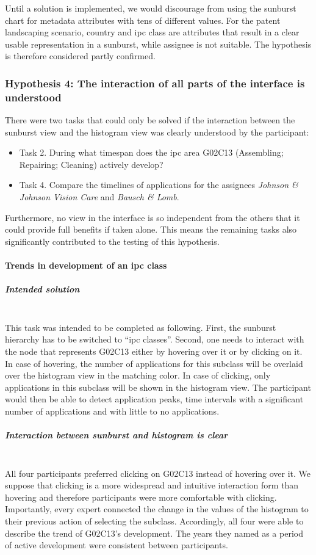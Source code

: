 Until a solution is implemented, we would discourage from using the sunburst chart for metadata attributes with tens of different values.
For the patent landscaping scenario, country and \gls{ipc} class are attributes that result in a clear usable representation in a sunburst, while assignee is not suitable.
The hypothesis is therefore considered partly confirmed.

\subsubsection{Hypothesis 4: The interaction of all parts of the interface is understood}
\label{subsubsec:hypothesis4}

There were two tasks that could only be solved if the interaction between the sunburst view and the histogram view was clearly understood by the participant:
\begin{itemize}
	\item Task 2. During what timespan does the \gls{ipc} area G02C13 (Assembling; Repairing; Cleaning) actively develop?
	\item Task 4. Compare the timelines of applications for the assignees \textit{Johnson \& Johnson Vision Care} and \textit{Bausch \& Lomb}.
\end{itemize}
Furthermore, no view in the interface is so independent from the others that it could provide full benefits if taken alone.
This means the remaining tasks also significantly contributed to the testing of this hypothesis.

\paragraph{Trends in development of an \gls{ipc} class}
\subparagraph{Intended solution}~\\
This task was intended to be completed as following. 
First, the sunburst hierarchy has to be switched to ``\gls{ipc} classes''.
Second, one needs to interact with the node that represents G02C13 either by hovering over it or by clicking on it.
In case of hovering, the number of applications for this subclass will be overlaid over the histogram view in the matching color.
In case of clicking, only applications in this subclass will be shown in the histogram view.
The participant would then be able to detect application peaks, time intervals with a significant number of applications and with little to no applications.

\subparagraph{Interaction between sunburst and histogram is clear}~\\
All four participants preferred clicking on G02C13 instead of hovering over it.
We suppose that clicking is a more widespread and intuitive interaction form than hovering and therefore participants were more comfortable with clicking.
Importantly, every expert connected the change in the values of the histogram to their previous action of selecting the subclass.
Accordingly, all four were able to describe the trend of G02C13's development.
The years they named as a period of active development were consistent between participants.

